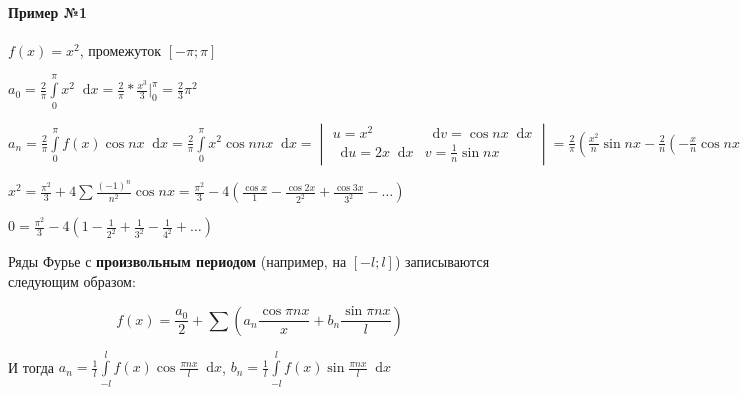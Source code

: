 \documentclass{article}
\newcommand*\diff{\mathop{}\!\mathrm{d}}
\begin{document}
\paragraph{Пример №1}

$f(x) = x^2$, промежуток $[-\pi; \pi]$

$a_0 = \frac{2}{\pi} \int\limits_{0}^{\pi} x^2 \diff x = \frac{2}{\pi} * \frac{x^3}{3} \bigg|_{0}^{\pi} = \frac{2}{3} \pi^2$

$a_{n} = \frac{2}{\pi} \int\limits_{0}^{\pi} f(x) \cos n x \diff x = \frac{2}{\pi} \int\limits_{0}^{\pi} x^2 \cos n n x \diff x = \begin{vmatrix}
    u = x^2 & \diff v = \cos n x \diff x \\
    \diff u = 2x \diff x & v = \frac{1}{n} \sin n x
\end{vmatrix} = \frac{2}{\pi} (\frac{x^2}{n} \sin n x - \frac{2}{n} (-\frac{x}{n} \cos n x + \frac{1}{n^2} \sin n x)) \bigg|_{0}^{\pi} = \frac{4}{\pi n^2} (\pi \cos \pi n - 0) = \frac{4 \cos \pi n}{n^2} = \frac{4}{n^2} (-1)^{n}$

\hfill

$x^2 = \frac{\pi^2}{3} + 4 \sum \frac{(-1)^{n}}{n^2} \cos n x = \frac{\pi^2}{3} - 4 (\frac{\cos x}{1} - \frac{\cos 2 x}{2^2} + \frac{\cos 3 x}{3^2} - \dots)$

$0 = \frac{\pi^2}{3} - 4 (1 - \frac{1}{2^2} + \frac{1}{3^2} - \frac{1}{4^2} + \dots)$

\hfill

Ряды Фурье с \textbf{произвольным периодом} (например, на $[-l; l]$) записываются следующим образом:

$$f(x) = \frac{a_0}{2} + \sum (a_{n} \frac{\cos \pi n x}{x} + b_{n} \frac{\sin \pi n x}{l})$$

И тогда $a_{n} = \frac{1}{l} \int\limits_{- l}^{l} f(x) \cos \frac{\pi n x}{l} \diff x$, $b_{n} = \frac{1}{l} \int\limits_{- l}^{l} f(x) \sin \frac{\pi n x}{l} \diff x$
\end{document}
